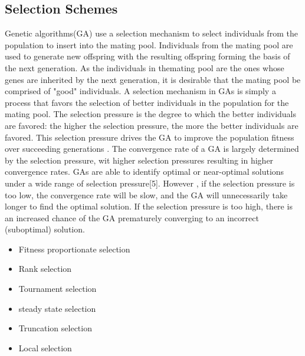 \documentclass[a4paper, 12pt]{article}
\begin{document}
\subsection{Selection Schemes}
Genetic algorithms(GA) use a selection mechanism to select individuals from the population to insert into the mating pool. Individuals from the mating pool are used to generate new offspring with the resulting offspring forming the basis of the next generation. As the individuals in themating pool are the ones whose genes are inherited by the next generation, it is desirable that the mating pool be comprised of "good" individuals. A selection mechanism in GAs is simply a process that favors the selection of better individuals in the population for the mating pool. 
The selection pressure is the degree to which the better individuals are favored: the higher the selection pressure, the more the better
individuals are favored. This selection pressure drives the GA to improve the population fitness over succeeding generations . The convergence
rate of a GA is largely determined by the selection pressure, wit higher selection pressures resulting in higher convergence rates. GAs are 
able to identify optimal or near-optimal solutions under a wide range of selection pressure[5]. However , if the selection pressure is too low, the convergence rate will be slow, and the GA will unnecessarily take longer to find the optimal solution. If the selection pressure is too 
high, there is an increased chance of the GA prematurely converging to an incorrect (suboptimal) solution.
\begin{itemize}
\item Fitness proportionate selection
\item Rank selection
\item Tournament selection
\item steady state selection
\item Truncation selection
\item Local selection
\end{itemize}
\end{document}
